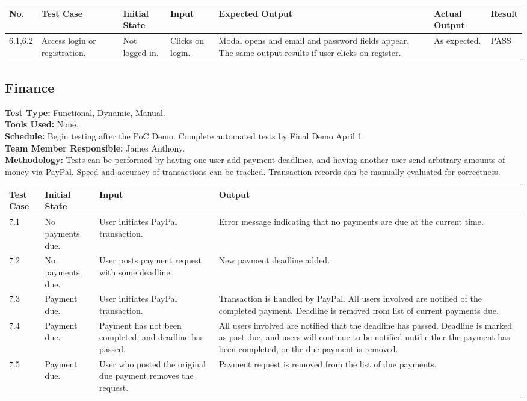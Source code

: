 \documentclass[12pt]{article}
\begin{document}
\begin{longtable}{|p{2.5cm}|p{1.5cm}|p{1.5cm}|p{2cm}|p{4cm}|p{2cm}|p{1.5cm}|}
\hline
\textbf{No.} & \textbf{Test Case}  & \textbf{Initial State} & \textbf{Input} & \textbf{Expected Output} & \textbf{Actual Output} & \textbf{Result}\\ 
\hline
6.1,6.2 & Access login or registration. & Not logged in. & Clicks on login. & Modal opens and email and password fields appear. The same output results if user clicks on register. & As expected. & PASS \\
\hline
\end{longtable}


\subsection{Finance}
\textbf{Test Type:} Functional, Dynamic, Manual. \\
\textbf{Tools Used:} None. \\
\textbf{Schedule:} Begin testing after the PoC Demo. Complete automated tests by Final Demo April 1. \\
\textbf{Team Member Responsible:} James Anthony. \\
\textbf{Methodology:} Tests can be performed by having one user add payment deadlines, and having another user send arbitrary amounts of money via PayPal. Speed and accuracy of transactions can be tracked. Transaction records can be manually evaluated for correctness.

\begin{longtable}{|p{2cm}|p{3cm}|p{5cm}|p{5cm}|}
\hline
\textbf{Test Case} & \textbf{Initial State} & \textbf{Input} & \textbf{Output} \\ \hline
7.1 & No payments due. & User initiates PayPal transaction. & Error message indicating that no payments are due at the current time.\\
\hline
7.2 & No payments due. & User posts payment request with some deadline. & New payment deadline added.\\
\hline
7.3 & Payment due. & User initiates PayPal transaction. & Transaction is handled by PayPal. All users involved are notified of the completed payment. Deadline is removed from list of current payments due.\\
\hline
7.4 & Payment due. & Payment has not been completed, and deadline has passed. & All users involved are notified that the deadline has passed. Deadline is marked as past due, and users will continue to be notified until either the payment has been completed, or the due payment is removed.\\
\hline
7.5 & Payment due. & User who posted the original due payment removes the request. & Payment request is removed from the list of due payments.\\
\hline
\end{longtable}
\end{document}

